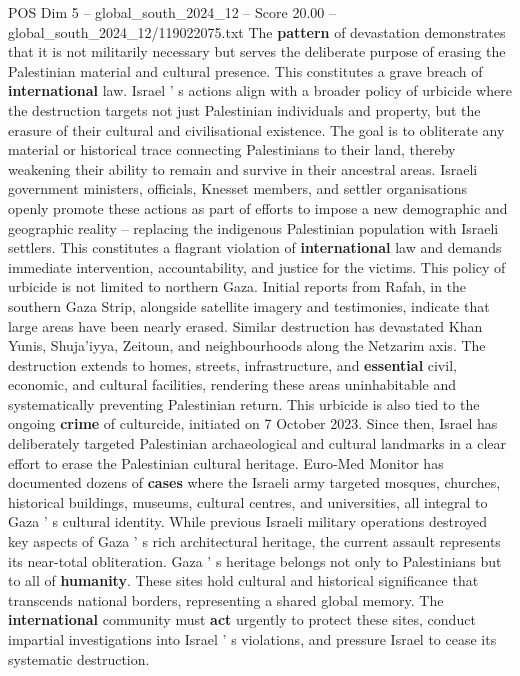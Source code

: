 \begin{textsample}{POS Dim 5 – global\_south\_2024\_12 – Score 20.00 – global\_south\_2024\_12/119022075.txt}
The \textbf{pattern} of devastation demonstrates that it is not militarily necessary but serves the deliberate purpose of erasing the Palestinian material and cultural presence.
This constitutes a grave breach of \textbf{international} law.
Israel ' s actions align with a broader policy of urbicide where the destruction targets not just Palestinian individuals and property, but the erasure of their cultural and civilisational existence.
The goal is to obliterate any material or historical trace connecting Palestinians to their land, thereby weakening their ability to remain and survive in their ancestral areas.
Israeli government ministers, officials, Knesset members, and settler organisations openly promote these actions as part of efforts to impose a new demographic and geographic reality -- replacing the indigenous Palestinian population with Israeli settlers.
This constitutes a flagrant violation of \textbf{international} law and demands immediate intervention, accountability, and justice for the victims.
This policy of urbicide is not limited to northern Gaza.
Initial reports from Rafah, in the southern Gaza Strip, alongside satellite imagery and testimonies, indicate that large areas have been nearly erased.
Similar destruction has devastated Khan Yunis, Shuja'iyya, Zeitoun, and neighbourhoods along the Netzarim axis.
The destruction extends to homes, streets, infrastructure, and \textbf{essential} civil, economic, and cultural facilities, rendering these areas uninhabitable and systematically preventing Palestinian return.
This urbicide is also tied to the ongoing \textbf{crime} of culturcide, initiated on 7 October 2023.
Since then, Israel has deliberately targeted Palestinian archaeological and cultural landmarks in a clear effort to erase the Palestinian cultural heritage.
Euro-Med Monitor has documented dozens of \textbf{cases} where the Israeli army targeted mosques, churches, historical buildings, museums, cultural centres, and universities, all integral to Gaza ' s cultural identity.
While previous Israeli military operations destroyed key aspects of Gaza ' s rich architectural heritage, the current assault represents its near-total obliteration.
Gaza ' s heritage belongs not only to Palestinians but to all of \textbf{humanity}.
These sites hold cultural and historical significance that transcends national borders, representing a shared global memory.
The \textbf{international} community must \textbf{act} urgently to protect these sites, conduct impartial investigations into Israel ' s violations, and pressure Israel to cease its systematic destruction.

\end{textsample}
